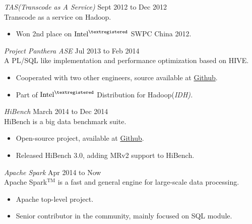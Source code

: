 \documentclass[line,margin]{res}
\begin{document}
\begin{resume}
                {\sl TAS(Transcode as A Service)} \hfill        Sept 2012 to Dec 2012\\
                Transcode as a service on Hadoop.
                  \begin{itemize}
                   \item Won 2nd place on $\textrm{Intel}^{\textregistered}$ SWPC China 2012.
                   \end{itemize}
                   
                {\sl Project Panthera ASE} \hfill        Jul 2013 to Feb 2014\\
                A PL/SQL like implementation and performance optimization based on HIVE.
                  \begin{itemize}
                   \item Cooperated with two other engineers, source available at \href{https://github.com/intel-hadoop/project-panthera}{Github}.
                   \item Part of $\textrm{Intel}^{\textregistered}$ Distribution for Hadoop(\sl IDH).
                   \end{itemize}

                {\sl HiBench} \hfill        March 2014 to Dec 2014\\
                HiBench is a big data benchmark suite.
                  \begin{itemize}
                   \item Open-source project, available at \href{https://github.com/intel-hadoop/HiBench}{Github}.
                   \item Released HiBench 3.0, adding MRv2 support to HiBench.
                   \end{itemize}

                {\sl Apache Spark} \hfill        Apr 2014 to Now\\
                Apache Spark$^{\textrm{TM}}$ is a fast and general engine for large-scale data processing.
                  \begin{itemize}
                   \item Apache top-level project.
                   \item Senior contributor in the community, mainly focused on SQL module.
                   \end{itemize}
                   

\end{resume}
\end{document}
